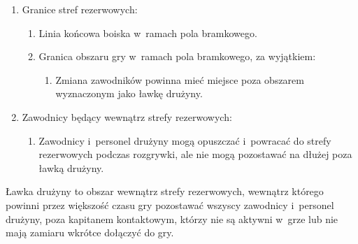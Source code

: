 \documentclass[12pt,a4paper]{article}
\renewcommand{\paragraph}[1]{
  \oldparagraph{#1}%
  \leftskip2.8cm
}
\begin{document}
\begin{enumerate}
	\item Granice stref rezerwowych:
	      \begin{enumerate}
		      \item Linia końcowa boiska w~ramach pola bramkowego.

		      \item Granica obszaru gry w~ramach pola bramkowego, za wyjątkiem:
		            \begin{enumerate}
			            \item Zmiana zawodników powinna mieć miejsce poza obszarem wyznaczonym jako
			                  ławkę drużyny.
		            \end{enumerate}
	      \end{enumerate}

	\item Zawodnicy będący wewnątrz strefy rezerwowych:
	      \begin{enumerate}
		      \item Zawodnicy i~personel drużyny mogą opuszczać i~powracać do strefy
		            rezerwowych podczas rozgrywki, ale nie mogą pozostawać na dłużej poza
		            ławką drużyny.
	      \end{enumerate}
\end{enumerate}

\paragraph{Ławki drużyn}
Ławka drużyny to obszar wewnątrz strefy
rezerwowych, wewnątrz którego powinni przez większość czasu gry
pozostawać wszyscy zawodnicy i~personel drużyny, poza kapitanem
kontaktowym, którzy nie są aktywni w~grze lub nie mają zamiaru wkrótce
dołączyć do gry.
\end{document}
